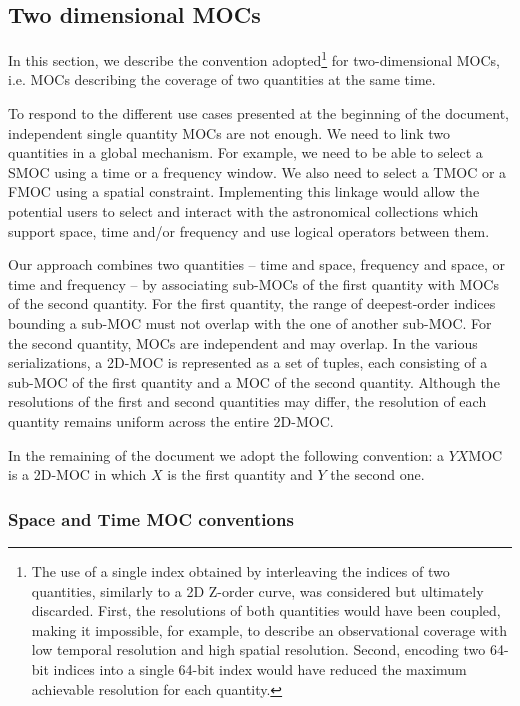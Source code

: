 \documentclass[11pt,a4paper]{ivoa}
\begin{document}
\subsection{Two dimensional MOCs}

In this section, we describe the convention adopted\footnote{The use of
a single index obtained by interleaving the indices of two quantities,
similarly to a 2D Z-order curve, was considered but ultimately discarded.
First, the resolutions of both quantities would have been coupled, making it
impossible, for example, to describe an observational coverage with low
temporal resolution and high spatial resolution.
Second, encoding two 64-bit indices into a single 64-bit index would have
reduced the maximum achievable resolution for each quantity.}
for two-dimensional MOCs, i.e. MOCs describing the coverage of two quantities
at the same time.

To respond to the different use cases presented at the beginning of 
the document, independent single quantity MOCs are not enough.
We need to link two quantities in a global mechanism.
For example, we need to be able to select a SMOC using a time or a frequency
window.
We also need to select a TMOC or a FMOC using a spatial constraint.
Implementing this linkage would allow
the potential users to select and interact with the astronomical
collections which support space, time and/or frequency and use logical
operators between them.

Our approach combines two quantities -- time and space, frequency and space,
or time and frequency -- by associating sub-MOCs of the first quantity with
MOCs of the second quantity.
For the first quantity, the range of deepest-order indices bounding a sub-MOC
must not overlap with the one of another sub-MOC.
For the second quantity, MOCs are independent and may overlap.
In the various serializations, a 2D-MOC is represented as a set of tuples, each
consisting of a sub-MOC of the first quantity and a MOC of the second quantity.
Although the resolutions of the first and second quantities may differ, 
the resolution of each quantity remains uniform across the entire 2D-MOC.

In the remaining of the document we adopt the following convention: 
a $YX$MOC is a 2D-MOC in which $X$ is the first quantity and $Y$ the second one.


\subsubsection{Space and Time MOC conventions\label{sec:stmoc}}
\end{document}
